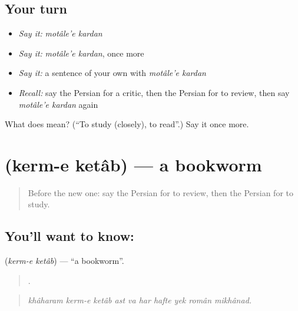 \subsection*{Your turn}
\begin{itemize}
\raggedright
  \item \emph{Say it:} \emph{motâle'e kardan}
  \item \emph{Say it:} \emph{motâle'e kardan}, once more
  \item \emph{Say it:} a sentence of your own with \emph{motâle'e kardan}
  \item \emph{Recall:} say the Persian for a critic, then the Persian for to review, then say \emph{motâle'e kardan} again
\end{itemize}

\begin{tcolorbox}[breakable,colback=teal!4,colframe=teal!35!black,title={Before you move on}]
What does   mean? (\textquotedblleft{}To study (closely), to read\textquotedblright{}.) Say it once more.
\end{tcolorbox}
\section[\texorpdfstring{\fa{کرم} \fa{کتاب} (kerm-e ketâb)}{کرم کتاب (kerm-e ketâb)}]{  (kerm-e ketâb) — a bookworm}

\label{lesson:FA-C529-kerm-e-ketab}



\begin{quote}
Before the new one: say the Persian for to review, then the Persian for to study.
\end{quote}

\subsection*{You'll want to know:  }
\textbf{ } (\emph{kerm-e ketâb}) — \textquotedblleft{}a bookworm\textquotedblright{}.

\begin{quote}
         .
\end{quote}

\begin{quote}
\emph{khâharam kerm-e ketâb ast va har hafte yek român mikhânad.}
\end{quote}

